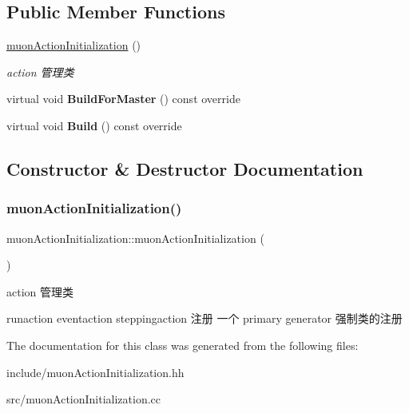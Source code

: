 \subsection*{Public Member Functions}
\begin{DoxyCompactItemize}
\item 
\hyperlink{classmuonActionInitialization_ac2975dc863ed514556de9e291a3a655d}{muon\+Action\+Initialization} ()
\begin{DoxyCompactList}\small\item\em action 管理类 \end{DoxyCompactList}\item 
\mbox{\label{classmuonActionInitialization_a6819e8906b517d01966731ccbbac388d}} 
virtual void {\bfseries Build\+For\+Master} () const override
\item 
\mbox{\label{classmuonActionInitialization_afa2c061aba623bc3dcdf417188b17492}} 
virtual void {\bfseries Build} () const override
\end{DoxyCompactItemize}


\subsection{Constructor \& Destructor Documentation}
\mbox{\label{classmuonActionInitialization_ac2975dc863ed514556de9e291a3a655d}} 
\subsubsection{\texorpdfstring{muon\+Action\+Initialization()}{muonActionInitialization()}}
{\footnotesize\ttfamily muon\+Action\+Initialization\+::muon\+Action\+Initialization (\begin{DoxyParamCaption}{ }\end{DoxyParamCaption})}



action 管理类 

runaction eventaction steppingaction 注册 一个 primary generator 强制类的注册 

The documentation for this class was generated from the following files\+:\begin{DoxyCompactItemize}
\item 
include/muon\+Action\+Initialization.\+hh\item 
src/muon\+Action\+Initialization.\+cc\end{DoxyCompactItemize}
